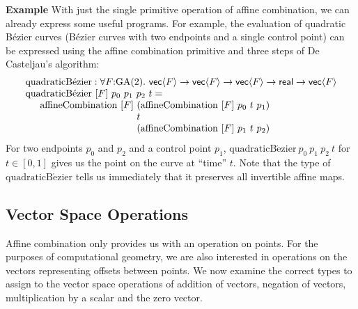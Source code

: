 \documentclass{article}
\newcommand{\GA}{\mathrm{GA}}
\newenvironment{example}{\vspace{0.1in}\noindent\textbf{Example}\quad}{}
\begin{document}
\begin{example}
  With just the single primitive operation of affine combination, we
  can already express some useful programs. For example, the
  evaluation of quadratic B\'{e}zier curves (B\'{e}zier curves with
  two endpoints and a single control point) can be expressed using the
  affine combination primitive and three steps of De Casteljau's
  algorithm:
  \begin{displaymath}
    \begin{array}{l}
      \mathrm{quadraticB\acute{e}zier} : \forall F \mathord:\GA(2).\ \mathsf{vec}\langle F \rangle \to \mathsf{vec}\langle F \rangle \to \mathsf{vec}\langle F \rangle \to \mathsf{real} \to \mathsf{vec}\langle F \rangle \\
      \mathrm{quadraticB\acute{e}zier}\ [F]\ p_0\ p_1\ p_2\ t = \\
      \quad
      \begin{array}{l@{\hspace{-0.002cm}}l}
        \mathrm{affineCombination}\ [F]\ & (\mathrm{affineCombination}\ [F]\ p_0\ t\ p_1) \\
        & t \\
        & (\mathrm{affineCombination}\ [F]\ p_1\ t\ p_2)
      \end{array}
    \end{array}
  \end{displaymath}
  For two endpoints $p_0$ and $p_2$ and a control point $p_1$,
  $\mathrm{quadraticB\acute{e}zier}\ p_0\ p_1\ p_2\ t$ for $t \in
  [0,1]$ gives us the point on the curve at ``time'' $t$. Note that
  the type of $\mathrm{quadraticB\acute{e}zier}$ tells us immediately
  that it preserves all invertible affine maps.
\end{example}

\subsection{Vector Space Operations}
\label{sec:vector-space-ops}

Affine combination only provides us with an operation on points. For
the purposes of computational geometry, we are also interested in
operations on the vectors representing offsets between points. We now
examine the correct types to assign to the vector space operations of
addition of vectors, negation of vectors, multiplication by a scalar
and the zero vector.
\end{document}
